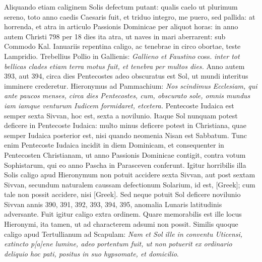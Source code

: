\begin{parnumbers}
{}
\lnr{}Aliquando etiam caliginem Solis defectum putant: qualis caelo ut plurimum
sereno, toto anno caedis Caesaris fuit, et triduo integro, me puero,
sed pallida: at horrenda, et atra in articulo Passionis Dominicae
per aliquot horas: in anno autem Christi 798 per 18 dies ita atra, ut
naves in mari aberrarent: sub Commodo Kal. Ianuariis repentina caligo,
ac tenebrae in circo obortae, teste Lampridio.
\lnr{}Trebellius Pollio in
Gallienis: \textit{Gallieno et Faustino}
 coss. \textit{inter tot bellicas clades etiam terra
motus fuit, et tenebra per multos dies.}
\lnr{}Anno autem 393, aut 394, circa
dies Pentecostes adeo obscuratus est Sol, ut mundi interitus imminere
crederetur.
\lnr{}Hieronymus ad Pammachium: \textit{Nos scindimus Ecclesiam,
qui ante paucos menses, circa dies Pentecostes, cum, obscurato
sole, omnis mundus iam iamque venturum Iudicem formidaret, etcetera.}
\lnr{}Pentecoste Iudaica est semper sexta Sivvan, hoc est, sexta a novilunio.
\lnr{}Itaque Sol nunquam potest deficere in Pentecoste Iudaica: multo minus
deficere potest in Christiana, quae semper Iudaica posterior est, nisi
quando neomenia Nisan est Sabbatum.
\lnr{}Tunc enim Pentecoste Iudaica
incidit in diem Dominicam, et consequenter in Pentecosten Christianam,
ut anno Passionis Dominicae contigit, contra votum Sophistarum,
qui eo anno Pascha in Parasceven conferunt.
\lnr{}Igitur horribilis
illa Solis caligo apud Hieronymum non potuit accidere sexta Sivvan,
aut post sextam Sivvan, secundum naturalem caussam defectionum
Solarium, id est, \textgreek{[Greek]}; cum tale non possit
accidere, nisi \textgreek{[Greek]}.
\lnr{}Sed neque potuit Sol deficere novilunio
Sivvan annis 390, 391, 392, 393, 394, 395, anomalia Lunaris latitudinis
adversante.
\lnr{}Fuit igitur caligo extra ordinem.
\lnr{}Quare memorabilis
est ille locus Hieronymi, ita tamen, ut ad characterem adsumi non
possit.
\lnr{}Similis quoque caligo apud Tertullianum ad Scapulam: \textit{Nam et
Sol ille in conventu Uticensi, extincto p[a]ene lumine, adeo portentum fuit, ut
non potuerit ex ordinario deliquio hoc pati, positus in suo hypsomate, et
domicilio}.

\end{parnumbers}

